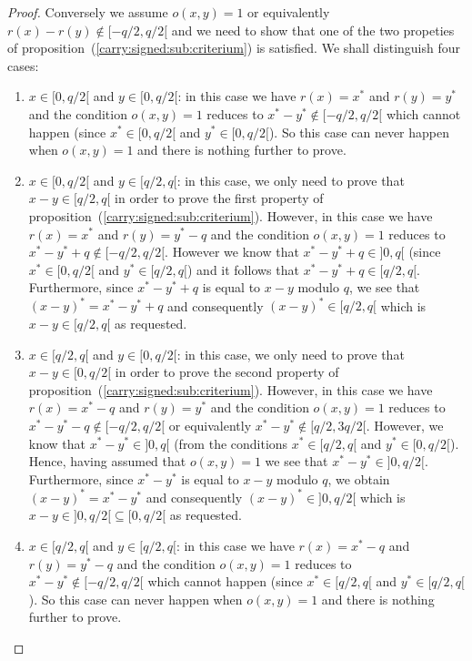 \documentclass{article}
\begin{document}
\begin{proof}
  Conversely we assume $o(x,y)=1$ or equivalently
  $r(x)-r(y)\not\in[-q/2,q/2[$ and we need to show that one of
  the two propeties of proposition~(\ref{carry:signed:sub:criterium})
  is satisfied. We shall distinguish four cases:
  \begin{enumerate}
    \item $x\in[0,q/2[$ and $y\in[0,q/2[$: in this case we have $r(x)=x^{*}$
      and $r(y)=y^{*}$ and the condition $o(x,y)=1$ reduces to
      $x^{*}-y^{*}\not\in[-q/2,q/2[$ which cannot happen (since
      $x^{*}\in[0,q/2[$ and $y^{*}\in[0,q/2[$). So this case can 
      never happen when $o(x,y)=1$ and there is nothing further to 
      prove.
     \item $x\in[0,q/2[$ and $y\in[q/2,q[$: in this case, we only
      need to prove that $x-y\in[q/2,q[$ in order to prove the first 
      property of proposition~(\ref{carry:signed:sub:criterium}).
      However, in this case we have $r(x)=x^{*}$ and $r(y)=y^{*}-q$
      and the condition $o(x,y)=1$ reduces to 
      $x^{*}-y^{*}+q\not\in[-q/2,q/2[$. However we know that 
      $x^{*}-y^{*}+q\in]0,q[$ 
      (since $x^{*}\in[0,q/2[$ and $y^{*}\in[q/2,q[$) and it follows
      that $x^{*}-y^{*}+q\in[q/2,q[$. Furthermore, since $x^{*}-y^{*}+q$ is
      equal to $x-y$ modulo $q$, we see that $(x-y)^{*}=x^{*}-y^{*}+q$
      and consequently $(x-y)^{*}\in[q/2,q[$ which is $x-y\in[q/2,q[$
      as requested.
   \item $x\in[q/2,q[$ and $y\in[0,q/2[$: in this case, we only 
      need to prove that $x-y\in[0,q/2[$ in order to prove the 
      second property of proposition~(\ref{carry:signed:sub:criterium}). 
      However, in this case we have $r(x)=x^{*}-q$ and $r(y)=y^{*}$
      and the condition $o(x,y)=1$ reduces to 
      $x^{*}-y^{*}-q\not\in[-q/2,q/2[$ or equivalently $x^{*}-y^{*}\not\in
      [q/2,3q/2[$. However, we know that $x^{*}-y^{*}\in]0,q[$
      (from the conditions $x^{*}\in[q/2,q[$ and $y^{*}\in[0,q/2[$). 
      Hence, having assumed that $o(x,y)=1$ we see that 
      $x^{*}-y^{*}\in]0,q/2[$. Furthermore, since
      $x^{*}-y^{*}$ is equal to $x-y$ modulo $q$, we obtain
      $(x-y)^{*}=x^{*}-y^{*}$ and consequently $(x-y)^{*}\in]0,q/2[$
      which is $x-y\in]0,q/2[\subseteq[0,q/2[$ as requested.
   \item $x\in[q/2,q[$ and $y\in[q/2,q[$: in this case we have
     $r(x)=x^{*}-q$ and $r(y)=y^{*}-q$ and the condition $o(x,y)=1$
      reduces to $x^{*}-y^{*}\not\in[-q/2,q/2[$ which cannot happen
      (since $x^{*}\in[q/2,q[$ and $y^{*}\in[q/2,q[$). So this case can
      never happen when $o(x,y)=1$ and there is nothing further to prove.
   \end{enumerate}
\end{proof}
\end{document}
